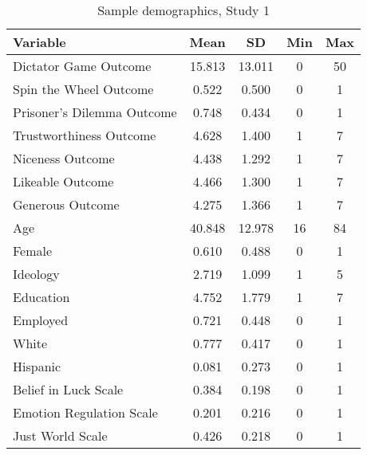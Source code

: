 \renewcommand{\baselinestretch}{1.25}%
\begin{table}[H]
\centering

\begin{threeparttable}
\caption{Sample demographics, Study 1}

\begin{tabular}[t]{lcccc}
\toprule
Variable & Mean & SD & Min & Max\\
\midrule
Dictator Game Outcome & 15.813 & 13.011 & 0 & 50\\
Spin the Wheel Outcome & 0.522 & 0.500 & 0 & 1\\
Prisoner's Dilemma Outcome & 0.748 & 0.434 & 0 & 1\\
Trustworthiness Outcome & 4.628 & 1.400 & 1 & 7\\
Niceness Outcome & 4.438 & 1.292 & 1 & 7\\
Likeable Outcome & 4.466 & 1.300 & 1 & 7\\
Generous Outcome & 4.275 & 1.366 & 1 & 7\\
Age & 40.848 & 12.978 & 16 & 84\\
Female & 0.610 & 0.488 & 0 & 1\\
Ideology & 2.719 & 1.099 & 1 & 5\\
Education & 4.752 & 1.779 & 1 & 7\\
Employed & 0.721 & 0.448 & 0 & 1\\
White & 0.777 & 0.417 & 0 & 1\\
Hispanic & 0.081 & 0.273 & 0 & 1\\
Belief in Luck Scale & 0.384 & 0.198 & 0 & 1\\
Emotion Regulation Scale & 0.201 & 0.216 & 0 & 1\\
Just World Scale & 0.426 & 0.218 & 0 & 1\\
\bottomrule
\end{tabular}
\label{tab:exp1_sample}
\begin{tablenotes}[flushleft]
\scriptsize
\item[\hspace{-5mm}] 
\end{tablenotes}
\end{threeparttable}
\end{table}
\renewcommand{\baselinestretch}{1.67}%
